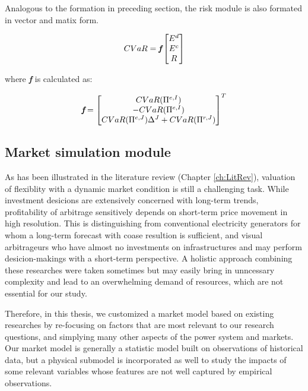 Analogous to the formation in preceding section, the risk module is also formated in vector and matix form.

\begin{equation*}
CVaR= \textit{\textbf{f}}
\begin{bmatrix}
E^d \\ E^c \\ R
\end{bmatrix}
\end{equation*}

where \textit{\textbf{f}} is calculated as:

\begin{equation}
\textit{\textbf{f}} =
\begin{bmatrix}
CVaR(\Pi^{e,I})\\-CVaR(\Pi^{e,I})\\CVaR(\Pi^{e,J}) \Delta^J + CVaR(\Pi^{r,J})
\end{bmatrix}^T
\end{equation}

\subsection{Market simulation module}
As has been illustrated in the literature review (Chapter \ref{ch:LitRev}), valuation of flexiblity with a dynamic market condition is still a challenging task. While investment desicions are extensively concerned with long-term trends, profitability of arbitrage sensitively depends on short-term price movement in high resolution. This is distinguishing from conventional electricity generators for whom a long-term forecast with coase resultion is sufficient, and visual arbitrageurs who have almost no investments on infrastructures and may perform desicion-makings with a short-term perspective. A holistic approach combining these researches were taken sometimes \cite{Rastler2010}\cite{Eyer2010} but may easily bring in unncessary complexity and lead to an overwhelming demand of resources, which are not essential for our study.

Therefore, in this thesis, we customized a market model based on existing researches by re-focusing on factors that are most relevant to our research questions, and simplying many other aspects of the power system and markets. Our market model is generally a statistic model built on observations of historical data, but a physical submodel is incorporated as well to study the impacts of some relevant variables whose features are not well captured by empirical observations.


